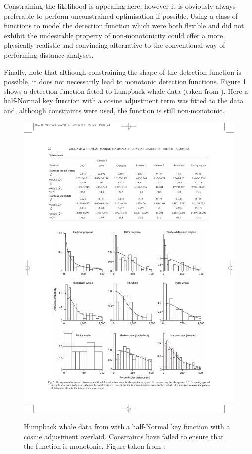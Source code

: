 Constraining the likelihood is appealing here, however it is obviously always preferable to perform unconstrained optimisation if possible. Using a class of functions to model the detection function which were both flexible and did not exhibit the undesirable property of non-monotonicity could offer a more physically realistic and convincing alternative to the conventional way of performing distance analyses.

Finally, note that although constraining the shape of the detection function is possible, it does not necessarily lead to monotonic detection functions. Figure \ref{humpback-nonmono} shows a detection function fitted to humpback whale data (taken from \cite{williams}). Here a half-Normal key function with a cosine adjustment term was fitted to the data and, although constraints were used, the function is still non-monotonic.

\begin{figure}
\centering
\includegraphics{intro/figs/humpback-nonmono.pdf}\\
\caption{Humpback whale data from  with a half-Normal key function with a cosine adjustment overlaid. Constraints have failed to ensure that the function is monotonic. Figure taken from .}
\label{humpback-nonmono}
\end{figure}




